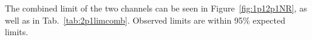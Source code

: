 
The combined limit of the two channels can be seen in Figure~\ref{fig:1p12p1NR}, as well as in Tab.~\ref{tab:2p1limcomb}. Observed limits are within 95\% expected limits.

